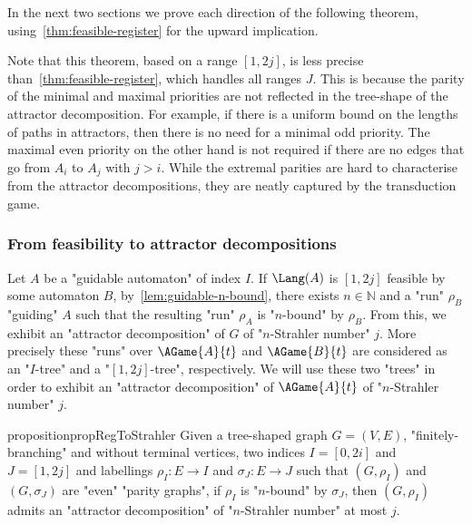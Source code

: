 \documentclass[a4paper,UKenglish,cleveref, autoref, thm-restate]{lipics-v2021}
\newcommand{\NN}{\mathbb{N}}
\begin{document}
In the next two sections we prove each direction of the following theorem, using~\cref{thm:feasible-register} for the upward implication.

\thmparityattractors*

\begin{remark}Note that this theorem, based on a range $[1,2j]$, is less precise than~\cref{thm:feasible-register}, which handles all ranges $J$. This is because the parity of the minimal and maximal priorities are not reflected in the tree-shape of the attractor decomposition. For example, if there is a uniform bound on the lengths of paths in attractors, then there is no need for a minimal odd priority. The maximal even priority on the other hand is not required if there are no edges that go from $A_i$ to $A_j$ with $j>i$.  While the extremal parities are hard to characterise from the attractor decompositions, they are neatly captured by the transduction game.
	\end{remark}

\subsubsection{From feasibility to attractor decompositions}

Let $A$ be a "guidable automaton" of index $I$. If $\Lang(A)$ is $[1,2j]$ feasible by some automaton $B$, by~\cref{lem:guidable-n-bound}, there exists $n\in \NN$ and a "run" $\rho_B$ "guiding" $A$ such that the resulting "run" $\rho_A$ is "$n$-bound" by $\rho_B$. From this, we exhibit an "attractor decomposition" of $G$ of "$n$-Strahler number" $j$. More precisely these "runs" over $\AGame{A}{t}$ and $\AGame{B}{t}$ are considered as an "$I$-tree" and a "$[1,2j]$-tree", respectively. We will use these two "trees" in order to exhibit an "attractor decomposition" of $\AGame{A}{t}$ of "$n$-Strahler number" $j$.

\begin{restatable}{proposition}{propRegToStrahler}\label{lem:Reg-to-Strahler}
Given a tree-shaped graph $G=(V,E)$, "finitely-branching" and without terminal vertices,
two indices $I=[0,2i]$ and  $J=[1,2j]$ and
labellings $\rho_I:E\rightarrow I$ and $\sigma_J: E\rightarrow J$
such that $(G,\rho_I)$ and $(G,\sigma_J)$ are "even" "parity graphs",
if $\rho_I$ is "$n$-bound" by $\sigma_J$, 
then $(G,\rho_I)$ admits an "attractor decomposition" of "$n$-Strahler number" at most $j$.
\end{restatable}
\end{document}
